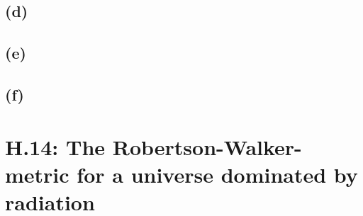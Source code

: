 \subsection*{(d)}

\subsection*{(e)}

\subsection*{(f)}

\section*{H.14: The Robertson-Walker-metric for a universe dominated by
radiation}

\IfFileExists{\bibliographyfile}{
    \printbibliography
}{}



